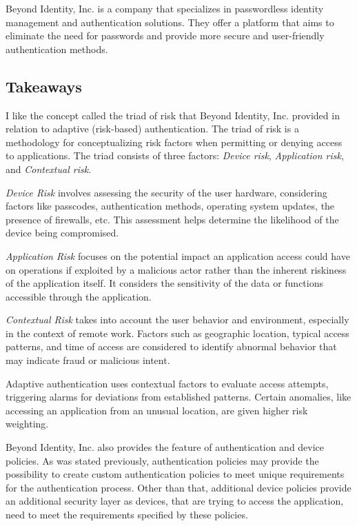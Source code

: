 Beyond Identity, Inc. is a company that specializes in passwordless identity management and authentication solutions. They offer a platform that aims to eliminate the need for passwords and provide more secure and user-friendly authentication methods.

\subsection*{Takeaways}
I like the concept called the triad of risk that Beyond Identity, Inc. provided in relation to adaptive (risk-based) authentication.
The triad of risk is a methodology for conceptualizing risk factors when permitting or denying access to applications.
The triad consists of three factors: \textit{Device risk}, \textit{Application risk}, and \textit{Contextual risk}.

\textit{Device Risk} involves assessing the security of the user hardware, considering factors like passcodes, authentication methods, operating system updates, the presence of firewalls, etc.
This assessment helps determine the likelihood of the device being compromised.

\textit{Application Risk} focuses on the potential impact an application access could have on operations if exploited by a malicious actor rather than the inherent riskiness of the application itself.
It considers the sensitivity of the data or functions accessible through the application.

\textit{Contextual Risk} takes into account the user behavior and environment, especially in the context of remote work.
Factors such as geographic location, typical access patterns, and time of access are considered to identify abnormal behavior that may indicate fraud or malicious intent.

Adaptive authentication uses contextual factors to evaluate access attempts, triggering alarms for deviations from established patterns.
Certain anomalies, like accessing an application from an unusual location, are given higher risk weighting.

Beyond Identity, Inc. also provides the feature of authentication and device policies.
As was stated previously, authentication policies may provide the possibility to create custom authentication policies to meet unique requirements for the authentication process.
Other than that, additional device policies provide an additional security layer as devices, that are trying to access the application, need to meet the requirements specified by these policies.


